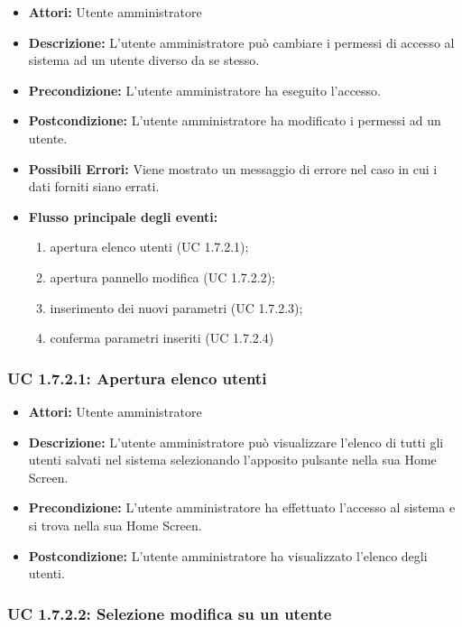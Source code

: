\begin{itemize}
    \item \textbf{Attori:} Utente amministratore
    \item \textbf{Descrizione:} L'utente amministratore può cambiare i permessi di accesso al sistema ad un utente diverso da se stesso.
    \item \textbf{Precondizione:} L'utente amministratore ha eseguito l'accesso.
    \item \textbf{Postcondizione:} L'utente amministratore ha modificato i permessi ad un utente.
    \item \textbf{Possibili Errori:}
    Viene mostrato un messaggio di errore nel caso in cui i dati forniti siano errati.
    \item \textbf{Flusso principale degli eventi:}

    \begin{enumerate}
        \item apertura elenco utenti (UC 1.7.2.1);
        \item apertura pannello modifica (UC 1.7.2.2);
        \item inserimento dei nuovi parametri (UC 1.7.2.3);
        \item conferma parametri inseriti (UC 1.7.2.4)
    \end{enumerate}

\end{itemize}

\subsubsection{UC 1.7.2.1: Apertura elenco utenti}

\begin{itemize}
    \item \textbf{Attori:} Utente amministratore
    \item \textbf{Descrizione:} L'utente amministratore può visualizzare l'elenco di tutti gli utenti salvati nel sistema selezionando l'apposito pulsante nella sua Home Screen.
    \item \textbf{Precondizione:} L'utente amministratore ha effettuato l'accesso al sistema e si trova nella sua Home Screen.
    \item \textbf{Postcondizione:} L'utente amministratore ha visualizzato l'elenco degli utenti.
\end{itemize}

\subsubsection{UC 1.7.2.2: Selezione modifica su un utente}

